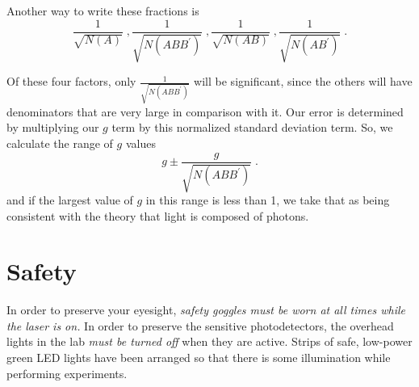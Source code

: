 Another way to write these fractions is
\[\frac{1}{\sqrt{N(A)}}\;, \frac{1}{\sqrt{N(ABB^\prime)}}\;, \frac{1}{\sqrt{N(AB)}}\;,\frac{1}{\sqrt{N(AB^\prime)}}\;. \]  

Of these four factors, only $\frac{1}{\sqrt{N(ABB^\prime)}}$ will be significant, since the others will have denominators that are very large in comparison with it.  Our error is determined by multiplying our $g$ term by this normalized standard deviation term.  So, we calculate the range of $g$ values
\begin{equation*}
g \pm \frac{g}{\sqrt{N(ABB^\prime)}}\;.
\end{equation*}
and if the largest value of $g$ in this range is less than 1, we take that as being consistent with the theory that light is composed of photons.

\section*{Safety}

In order to preserve your eyesight, \emph{safety goggles must be worn at all times while the laser is on.} In order to preserve the sensitive photodetectors, the overhead lights in the lab \emph{must be turned off} when they are active. Strips of safe, low-power green LED lights have been arranged so that there is some illumination while performing experiments.
